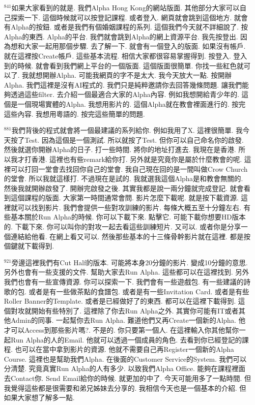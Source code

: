 \documentclass{book}
\begin{document}
$^{841}$如果大家看到的就是.
我們Alpha Hong Kong的網站版面.
其他部分大家可以自己探索一下.
這個時候就可以按登記課程.
或者登入.
網頁就會跳到這個地方.
就會有Alpha的按鈕.
或者是我們有個婚姻課程的系列.
這個我們今天就不詳細說了.
按Alpha的東西.
Alpha的平台.
我們就會跳到Alpha的網上資源平台.
我先按登出.
因為想和大家一起用那個步驟.
去了解一下.
就會有一個登入的版面.
如果沒有帳戶.
就在這裡按Create帳戶.
這些基本流程.
相信大家都很容易掌握得到.
按登入.
登入到的時候.
就會看到我們網上平台的一個版面.
這個版面很簡單.
你找一些紅色就可以了.
我就想開辦Alpha.
可能我網頁的字不是太大.
我今天放大一點.
按開辦Alpha.
我們這裡是沒有AI程式的.
我們只是純粹邀請你去回答幾條問題.
讓我們能夠透過這些filter.
去介紹一個最適合大家的Alpha內容.
例如我想開給青少年的.
這個是一個現場實體的Alpha.
我想用影片的.
這個Alpha就在教會裡面進行的.
按完這些內容.
我想用粵語的.
按完這些簡單的問題.

$^{881}$我們背後的程式就會將一個最建議的系列給你.
例如我用了X.
這裡很簡單.
我今天按了Test.
因為這個是一個測試.
所以就按了Test.
但你可以自己命名你的啟發.
然後就選你開辦Alpha的日子.
打一些時間.
將你的地址打進去.
我現在是香港.
所以我才打香港.
這裡也有些remark給你打.
另外就是究竟你是屬於什麼教會的呢.
這裡可以打回一堂會去找回你自己的堂會.
我自己現在回的是一間叫做Crow Church的堂會.
所以我就這樣打.
不過現在是試的.
我就選我這個Alpha是和教會無關的.
然後我就開辦啟發了.
開辦完啟發之後.
其實我都是說一兩分鐘就完成登記.
就會看到這個課程的版面.
大家第一時間通常會問.
影片怎麼下載呢.
就是按下載資源.
這裡就可以找到影片.
我們會提供一些對攻訓練的影片.
每條大概五至十分鐘左右.
有些基本關於Run Alpha的時候.
你可以下載下來.
點擊它.
可能下載你想要HD版本的.
下載下來.
你可以叫你的對攻一起去看這些訓練短片.
又可以.
或者你是分享一個連結給他看.
在網上看又可以.
然後那些基本的十三條骨幹影片就在這裡.
都是按個鍵就下載得到.

$^{921}$旁邊這裡我們有Cut Half的版本.
可能將本身20分鐘的影片.
變成10分鐘的意思.
另外也會有一些支援的文件.
幫助大家去Run Alpha.
這些都可以在這裡找到.
另外我們也會有一些宣傳資源.
你可以探索一下.
我們會有一些遊戲包.
有一些建議的詩歌的包.
或者是有一些做茶點的食譜包.
或者是有一些Invitation Card.
或者是有些Roller Banner的Template.
或者是已經做好了的東西.
都可以在這裡下載得到.
這個對攻就開始有些特別了.
這裡除了你去Run Alpha之外.
其實你可能有IT或者其他Admin的同事.
一起幫你去Run Alpha.
難道他們又再Create一個新的Alpha.
他才可以Access到那些影片嗎?.
不是的.
你只要第一個人.
在這裡輸入你其他幫你一起Run Alpha的人的Email.
他就可以透過一個成員的角色.
去看到你已經登記的課程.
也可以在當中拿到影片的資源.
他就不需要自己再Register一個新的Alpha Course.
這裡也是幫助我們Alpha.
在後面的Customer Service的System.
我們可以分清楚.
究竟真實Run Alpha的人有多少.
以致我們Alpha Office.
能夠在課程裡面去Contact你.
Send Email給你的時候.
就更加的中了.
今天可能用多了一點時間.
但我覺得這些都是很需要和弟兄姊妹去分享的.
我相信今天也是一個基本的介紹.
但如果大家想了解多一點.
\end{document}
